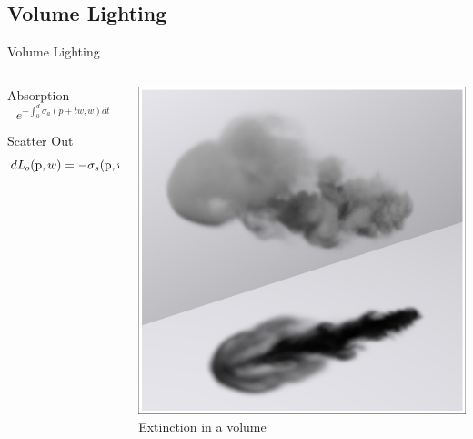 \documentclass[10pt,compress,professionalfont]{beamer}
\begin{document}
\subsection{Volume Lighting}
\begin{frame}{Volume Lighting}

    \begin{columns}
        \begin{column}{0.55\textwidth}

            \vspace{-10mm}
            \begin{block}{Absorption}
                \[
                    e^{-\int_{0}^{d}\sigma_{a} (p+t\mathit{w},\mathit{w})d\mathit{t}}
                \]
            \end{block}

            \begin{block}{Scatter Out}
                \[
                    d\mathit{L}_{o}(\textup{p},w) = -\sigma_{s}(\textup{p},w) \mathit{L}_{i}(\textup{p},-w)dt
                \]
            \end{block}

        \end{column}
        \begin{column}{0.45\textwidth}
            \vspace{-4mm}
            \includegraphics[width=\textwidth]{../img/external/scatter}\\
            {\centering\scriptsize Extinction in a volume\\}
        \end{column}
    \end{columns}

\end{frame}
\end{document}

